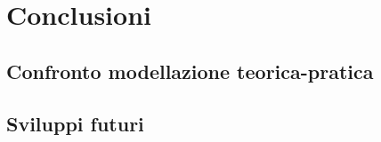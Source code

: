 \section{Conclusioni}
\subsection{Confronto modellazione teorica-pratica}
\subsection{Sviluppi futuri}
